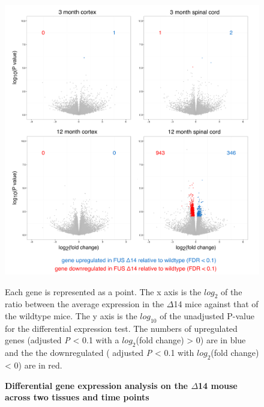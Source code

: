 \begin{figure}[h!]
	\centering
	\includegraphics[width=\textwidth]{Figures/04_fus_mice/anny_volcanos.png}
	\caption{\textbf{Differential gene expression analysis on the $\Delta$14 mouse across two tissues and time points}}
	Each gene is represented as a point. The x axis is the $log_2$ of the ratio between the average expression in the $\Delta$14 mice against that of the wildtype mice. The y axis is the $log_10$ of the unadjusted P-value for the differential expression test. The numbers of upregulated genes (adjusted \textit{P} < 0.1 with a $log_2$(fold change) > 0) are in blue and the the downregulated ( adjusted \textit{P} < 0.1 with $log_2$(fold change) < 0) are in red.
	\label{fig:delta14_volcanos}
\end{figure}

